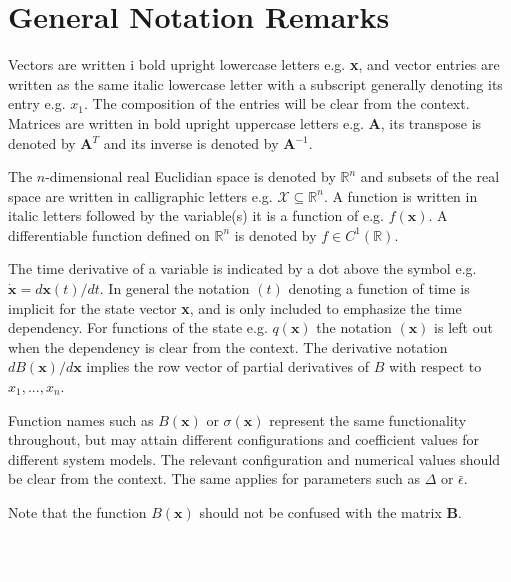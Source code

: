\section*{General Notation Remarks}
\vspace{0.1cm}

Vectors are written i bold upright lowercase letters e.g. \textbf{x}, and vector entries are written as the same italic lowercase letter with a subscript generally denoting its entry e.g. $x_1$. The composition of the entries will be clear from the context.
Matrices are written in bold upright uppercase letters e.g. \textbf{A}, its transpose is denoted by \textbf{A}$^T$ and its inverse  is denoted by \textbf{A}$^{-1}$.

The $n$-dimensional real Euclidian space is denoted by $\mathbb{R}^n$ and subsets of the real space are written in calligraphic letters e.g. $\mathcal{X}\subseteq \mathbb{R}^n$. 
A function is written in italic letters followed by the variable(s) it is a function of e.g. $f(\mathbf{x})$. A differentiable function defined on $\mathbb{R}^n$ is denoted by $f\in C^1(\mathbb{R})$.

The time derivative of a variable is indicated by a dot above the symbol e.g. $\dot{\mathbf{x}} = d\mathbf{x}(t)/dt$. In general the notation $(t)$ denoting a function of time is implicit for the state vector \textbf{x}, and is only included to emphasize the time dependency. For functions of the state e.g. $q(\mathbf{x})$  the notation $(\mathbf{x})$ is left out when the dependency is clear from the context. The derivative notation $dB(\mathbf{x})/d\mathbf{x}$ implies the row vector of partial derivatives of $B$ with respect to $x_1,...,x_n$. 

Function names such as $B(\mathbf{x})$ or $\sigma(\mathbf{x})$ represent the same functionality throughout, but may attain different configurations and  coefficient values for different system models. The relevant configuration and numerical values should be clear from the context. The same applies for parameters such as $\Delta$ or $\bar{\epsilon}$.

Note that the function $B(\mathbf{x})$ should not be confused with the matrix \textbf{B}.









\textcolor{white}{%
	\gls{injective_func} \gls{surjective_func} \gls{bijective_func}  \gls{compact_space}  \gls{extrinsic} \gls{intrinsic} \gls{tcp} \gls{Ts} \gls{y} \gls{radius_vec} \gls{center_vec}}